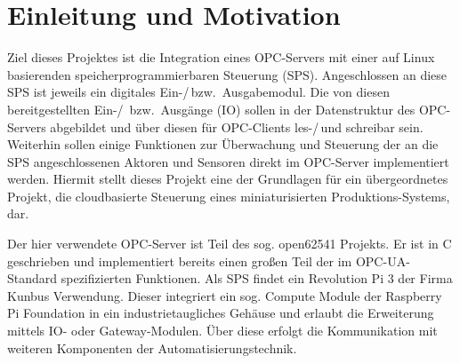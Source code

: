 %
%
%

% 
% 
%
%
%
%
%

\section{Einleitung und Motivation%
  \label{sec:1-einleitung}}
Ziel dieses Projektes ist die Integration eines OPC-Servers mit einer auf Linux
basierenden speicherprogrammierbaren Steuerung (SPS). Angeschlossen an diese SPS
ist jeweils ein digitales Ein-/\,bzw.~Ausgabemodul. Die von diesen bereitgestellten
Ein-/\, bzw.~Ausgänge (IO) sollen in der Datenstruktur des OPC-Servers abgebildet
und über diesen für OPC-Clients les-/\,und schreibar sein. Weiterhin sollen einige
Funktionen zur Überwachung und Steuerung der an die SPS angeschlossenen Aktoren
und Sensoren direkt im OPC-Server implementiert werden.
Hiermit stellt dieses Projekt eine der Grundlagen für ein übergeordnetes Projekt,
die cloudbasierte Steuerung eines miniaturisierten Produktions-Systems, dar.

Der hier verwendete OPC-Server ist Teil des sog. open62541 Projekts. Er ist in C
geschrieben und implementiert bereits einen großen Teil der im OPC-UA-Standard
spezifizierten Funktionen.
Als SPS findet ein Revolution Pi 3 der Firma Kunbus Verwendung. Dieser integriert
ein sog. Compute Module der Raspberry Pi Foundation in ein industrietaugliches
Gehäuse und erlaubt die Erweiterung mittels IO- oder Gateway-Modulen. Über diese
erfolgt die Kommunikation mit weiteren Komponenten der Automatisierungstechnik.

